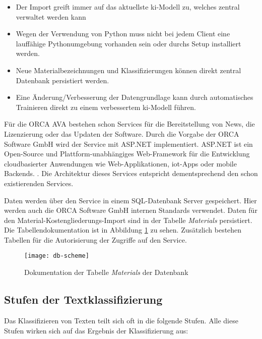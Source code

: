 \begin{itemize}
	\setlength\itemsep{0.3em}
	\item Der Import greift immer auf das aktuellste \ac{ki}-Modell zu, welches zentral verwaltet werden kann
	\item Wegen der Verwendung von Python muss nicht bei jedem Client eine lauffähige Pythonumgebung vorhanden sein oder durchs Setup installiert werden.
	\item Neue Materialbezeichnungen und Klassifizierungen können direkt zentral Datenbank persistiert werden.
	\item Eine Änderung/Verbesserung der Datengrundlage kann durch automatisches Trainieren direkt zu einem verbessertem \ac{ki}-Modell führen.
\end{itemize}
Für die ORCA AVA bestehen schon Services für die Bereitstellung von News, die Lizenzierung oder das Updaten der Software. Durch die Vorgabe der ORCA Software GmbH wird der Service mit ASP.NET implementiert. ASP.NET ist ein Open-Source und Plattform-unabhängiges Web-Framework für die Entwicklung cloudbasierter Anwendungen wie Web-Applikationen, \ac{iot}-Apps oder mobile Backends. \citep{asp-net}. Die Architektur dieses Services entspricht dementsprechend den schon existierenden Services.

Daten werden über den Service in einem SQL-Datenbank Server gespeichert. Hier werden auch die ORCA Software GmbH internen Standards verwendet. Daten für den Material-Kostengliederungs-Import sind in der Tabelle \textit{Materials} persistiert. Die Tabellendokumentation ist in Abbildung \ref{fig:db-scheme} zu sehen. Zusätzlich bestehen Tabellen für die Autorisierung der Zugriffe auf den Service.

\begin{figure}[H]
	\centering
	\texttt{[image: db-scheme]}
	\caption[Dokumentation]{Dokumentation der Tabelle \textit{Materials} der Datenbank}
	\label{fig:db-scheme}
\end{figure}
\subsection{Stufen der Textklassifizierung}
\label{c:conception:preprocessing}

Das Klassifizieren von Texten teilt sich oft in die folgende Stufen. Alle diese Stufen wirken sich auf das Ergebnis der Klassifizierung aus:

